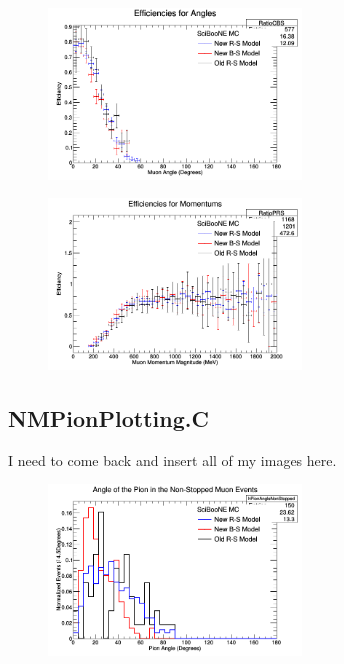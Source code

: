 \documentclass[11pt]{article}
\begin{document}
\begin{figure}[H]
\centering
\includegraphics[width=0.6\textwidth]{NMCombinedPlotsImages/24-NMCombinedPlots.png}
\caption{}
\end{figure}

\begin{figure}[H]
\centering
\includegraphics[width=0.6\textwidth]{NMCombinedPlotsImages/25-NMCombinedPlots.png}
\caption{}
\end{figure}

\subsection{NMPionPlotting.C}
I need to come back and insert all of my images here.

\begin{figure}[H]
\centering
\includegraphics[width=0.6\textwidth]{NMPionPlottingImages/1-NMPionPlotting.png}
\caption{}
\end{figure}
\end{document}
